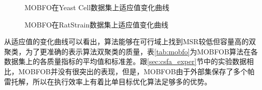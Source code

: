     \begin{figure}[htbp]
    \setlength{\subfigcapskip}{-1bp}
    \centering
    \begin{minipage}{.9\textwidth}
    \centering
    \subfigure{}\addtocounter{subfigure}{-2}
    \hspace{.2em}
    \subfigure{}\addtocounter{subfigure}{-2}
    \subfigure{\subfigure[GV]{\texttt{[image: mo\_yc\_gv]}}}
    \hspace{.2em}
    \subfigure{}\addtocounter{subfigure}{-2}
    \subfigure{\subfigure[CV]{\texttt{[image: mo\_yc\_cv]}}}
    \end{minipage}
    \vspace{0.2em}
    \caption{MOBFO在Yeast Cell数据集上适应值变化曲线}
    \label{fig:mobfo_yc}
    \end{figure}

    \begin{figure}[htbp]
    \setlength{\subfigcapskip}{-1bp}
    \centering
    \begin{minipage}{.9\textwidth}
    \centering
    \subfigure{}\addtocounter{subfigure}{-2}
    \hspace{.2em}
    \subfigure{}\addtocounter{subfigure}{-2}
    \hspace{.2em}
    \subfigure{}\addtocounter{subfigure}{-2}
    \end{minipage}
    \vspace{0.2em}
    \caption{MOBFO在RatStrain数据集上适应值变化曲线}
    \label{fig:mobfo_rat}
    \end{figure}
    从适应值的变化曲线可以看出，算法能够在可行域上找到MSR较低但容量高的双聚类，为了更准确的表示算法双聚类的质量，表\ref{tab:mobfo}为MOBFOB算法在各数据集上的各质量指标的平均值和标准差。跟\ref{sec:csfa_exper}节中的实验数据相比，MOBFOB并没有很突出的表现，但是，MOBFOB由于外部集保存了多个帕雷托解，所以在执行效率上有着比单目标优化算法足够多的优势。
    
